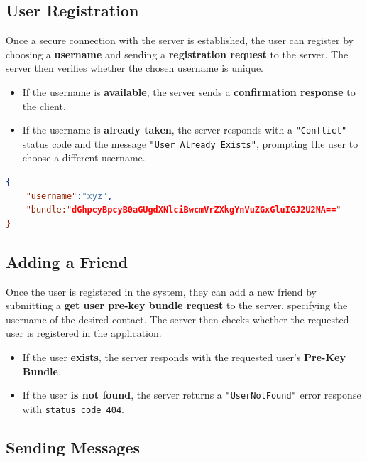 \subsection{User Registration}
\label{subsec:UserRegistration}

Once a secure connection with the server is established, the user can register by choosing a \textbf{username} and sending a \textbf{registration request} to the server. The server then verifies whether the chosen username is unique.

\begin{itemize}
    \item If the username is \textbf{available}, the server sends a \textbf{confirmation response} to the client.
    \item If the username is \textbf{already taken}, the server responds with a \texttt{"Conflict"} status code and the message \texttt{"User Already Exists"}, prompting the user to choose a different username.
\end{itemize}

\begin{lstlisting}[language=json, caption= Example of a Registration request]
{
    "username":"xyz",
    "bundle:"dGhpcyBpcyB0aGUgdXNlciBwcmVrZXkgYnVuZGxGluIGJ2U2NA=="
}
\end{lstlisting}

\subsection{Adding a Friend}
\label{subsec:AddingAFriend}

Once the user is registered in the system, they can add a new friend by submitting a \textbf{get user pre-key bundle request} to the server, specifying the username of the desired contact. The server then checks whether the requested user is registered in the application.

\begin{itemize}
    \item If the user \textbf{exists}, the server responds with the requested user's \textbf{Pre-Key Bundle}.
    \item If the user \textbf{is not found}, the server returns a \texttt{"UserNotFound"} error response with \texttt{status code 404}.
\end{itemize}

\subsection{Sending Messages}
\label{subsec:SendingMessages}

